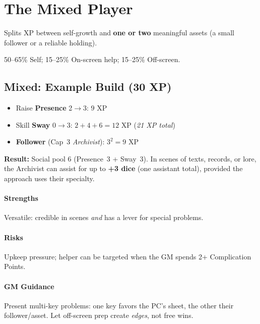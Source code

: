 \documentclass[12pt]{article}
\begin{document}

\section{The Mixed Player}
\begin{description}[leftmargin=2cm]
  \item[Definition:] Splits XP between self-growth and \textbf{one or two} meaningful assets (a small follower or a reliable holding).
  \item[Typical XP Spread:] 50--65\% Self; 15--25\% On-screen help; 15--25\% Off-screen.
\end{description}

\subsection*{Mixed: Example Build (30 XP)}
\begin{itemize}
  \item Raise \textbf{Presence} 2$\rightarrow$3: $9$ XP
  \item Skill \textbf{Sway} 0$\rightarrow$3: $2+4+6=12$ XP \hfill (\emph{21 XP total})
  \item \textbf{Follower} (Cap~3 \emph{Archivist}): $3^2=9$ XP
\end{itemize}

\textbf{Result:} Social pool 6 (Presence~3 + Sway~3).  
In scenes of texts, records, or lore, the Archivist can assist for up to \textbf{+3 dice} (one assistant total), provided the approach uses their specialty.

\paragraph{Strengths} Versatile: credible in scenes \emph{and} has a lever for special problems.  
\paragraph{Risks} Upkeep pressure; helper can be targeted when the GM spends 2+ Complication Points.  
\paragraph{GM Guidance} Present multi-key problems: one key favors the PC’s sheet, the other their follower/asset. Let off-screen prep create \emph{edges}, not free wins.

\end{document}
